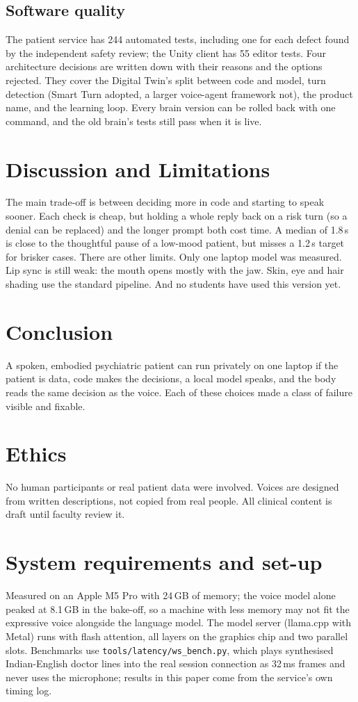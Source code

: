 \documentclass[journal]{IEEEtran}
\begin{document}
\subsection{Software quality}
The patient service has 244 automated tests, including one for each defect found by the independent safety review; the Unity client has 55
editor tests. Four architecture decisions are written down with their reasons and the options rejected. They cover the Digital Twin's split between code and model, turn detection (Smart Turn adopted, a larger voice-agent framework not), the product name, and the learning loop. Every brain version can be rolled back with one command, and the old brain's tests still pass when it is
live.

\section{Discussion and Limitations}
The main trade-off is between deciding more in code and starting to speak sooner. Each check is cheap, but holding a whole reply back on a risk
turn (so a denial can be replaced) and the longer prompt both cost time. A median of 1.8\,s is close to the thoughtful pause of a low-mood
patient, but misses a 1.2\,s target for brisker cases. There are other limits. Only one laptop model was measured. Lip sync is still weak: the mouth opens mostly with the jaw. Skin, eye and hair shading use the standard pipeline. And no students have used this version yet.

\section{Conclusion}
A spoken, embodied psychiatric patient can run privately on one laptop if the patient is data, code makes the decisions, a local model speaks, and
the body reads the same decision as the voice. Each of these choices made a class of failure visible and fixable.

\section*{Ethics}
No human participants or real patient data were involved. Voices are designed from written descriptions, not copied from real people. All clinical
content is draft until faculty review it.

\appendices
\section{System requirements and set-up}
Measured on an Apple M5 Pro with 24\,GB of memory; the voice model alone peaked at 8.1\,GB in the bake-off, so a machine with less
memory may not fit the expressive voice alongside the language model. The model server (llama.cpp with Metal) runs with flash attention,
all layers on the graphics chip and two parallel slots. Benchmarks use \texttt{tools/latency/ws\_bench.py}, which plays synthesised Indian-English doctor lines
into the real session connection as 32\,ms frames and never uses the microphone; results in this paper come from the service's own timing log.
\end{document}
